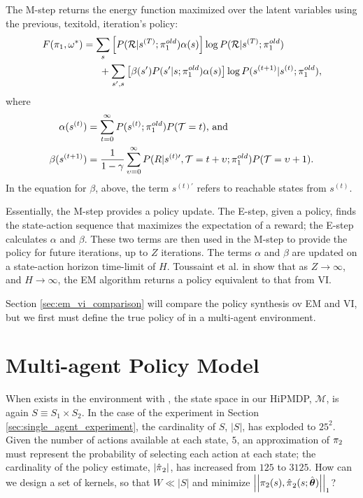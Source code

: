     \par
    The M-step returns the energy function maximized over the latent variables using the previous, texit{old},
    iteration's policy:
    \begin{equation} \label{eq:M_step}
        \begin{split}
            F(\pi_{1},\omega^*)
                & = \sum_s \left[ P(\mathcal{R}|s^{(T)};\pi_{1}^{old})\alpha(s)\right]
                        \log P(\mathcal{R}|s^{(T)};\pi_{1}^{old}) \\
                &\quad\ \ + \sum_{s',s}\left[ \beta(s')P(s'|s;\pi_{1}^{old})\alpha(s)\right]
                        \log P(s^{(t+1)}|s^{(t)};\pi_{1}^{old}),
        \end{split}
    \end{equation}
    where
    \begin{align*}
        \alpha(s^{(t)}) & = \sum_{t=0}^\infty P(s^{(t)}; \pi_{1}^{old})P(\mathcal{T}=t) \text{, and}\\
        \beta(s^{(t+1)}) & = \frac{1}{1-\gamma} \sum_{\upsilon=0}^{\infty}
            P(R|s^{(t)\prime},\mathcal{T}=t+\upsilon;\pi_{1}^{old})P(\mathcal{T}=\upsilon+1).
    \end{align*}
    \noindent
    In the equation for $\beta$, above, the term $s^{(t)\prime}$ refers to reachable states from $s^{(t)}$.

    Essentially, the M-step provides a policy update. The E-step, given a policy, finds the state-action sequence that
    maximizes the expectation of a reward; the E-step calculates $\alpha$ and $\beta$. These two terms are then used in
    the M-step to provide the policy for future iterations, up to $Z$ iterations. The terms $\alpha$ and $\beta$ are
    updated on a state-action horizon time-limit of $H$.  Toussaint et al. in \cite{toussaint2010expectation} show that
    as $Z\rightarrow{}\infty$, and $H\rightarrow{}\infty$, the EM algorithm returns a policy equivalent to that from VI.

    Section \ref{sec:em_vi_comparison} will compare the policy synthesis ov \ac{EM} and VI, but we first must define the
    true policy of  in a multi-agent environment.




\section{Multi-agent Policy Model}\label{sec:multi_agent_model}

    When  exists in the environment with , the state space in our \ac{HiPMDP}, $\mathcal{M}$, is again
    $S \equiv S_1 \times S_2$. In the case of the experiment in Section \ref{sec:single_agent_experiment}, the
    cardinality of $S$, $|S|$, has exploded to $25^2$. Given the number of actions available at each state, $5$, an
    approximation of $\pi_{2}$ must represent the probability of selecting each action at each state; the cardinality
    of the policy estimate, $|\hat{\pi_{}}_2|$, has increased from $125$ to $3125$. How can we design a set of
    kernels, so that $W \ll |S|$ and minimize $\left|\left|\pi_{2}(s), \hat{\pi_{}}_2(s;\hat{\boldsymbol{\mathbb{\theta}}})\right|\right|_1$?


